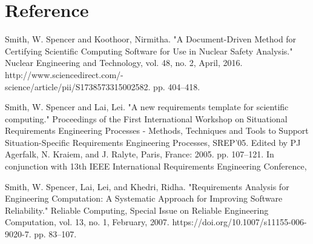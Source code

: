 \documentclass[12pt]{article}
\newcounter{refnum} %
\begin{document}
\newpage
\section*{Reference}
\begin{enumerate}[label={[\arabic*]}]
\item {} \label{ref1}
Smith, W. Spencer and Koothoor, Nirmitha. "A Document-Driven Method for Certifying Scientific Computing Software for Use in Nuclear Safety Analysis." Nuclear Engineering and Technology, vol. 48, no. 2, April, 2016. http://www.sciencedirect.com/-\\science/article/pii/S1738573315002582. pp. 404–418.
\item {} \label{ref2}
Smith, W. Spencer and Lai, Lei. "A new requirements template for scientific computing." Proceedings of the First International Workshop on Situational Requirements Engineering Processes - Methods, Techniques and Tools to Support Situation-Specific Requirements Engineering Processes, SREP'05. Edited by PJ Agerfalk, N. Kraiem, and J. Ralyte, Paris, France: 2005. pp. 107–121. In conjunction with 13th IEEE International Requirements Engineering Conference,
\item {} \label{ref3}
Smith, W. Spencer, Lai, Lei, and Khedri, Ridha. "Requirements Analysis for Engineering Computation: A Systematic Approach for Improving Software Reliability." Reliable Computing, Special Issue on Reliable Engineering Computation, vol. 13, no. 1, February, 2007. https://doi.org/10.1007/s11155-006-9020-7. pp. 83–107.
\end{enumerate}


\newpage

\noindent {}

\noindent {}
\end{document}
